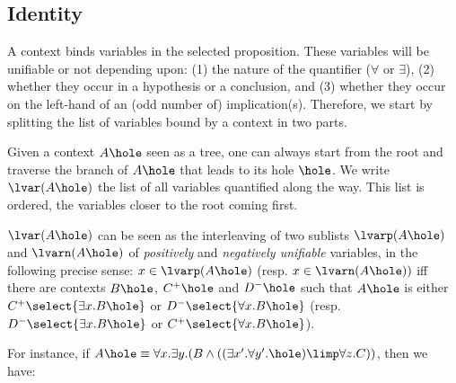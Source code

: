 \subsection{Identity}

A context binds variables in the selected proposition. These variables
will be unifiable or not depending upon: (1) the nature of the quantifier
($\forall$ or $\exists$), (2) whether they occur in a hypothesis or a
conclusion, and (3) whether they occur on the left-hand of an (odd number
of) implication(s). Therefore, we start by splitting the list of
variables bound by a context in two parts.


\begin{definition}
Given a context $A\hole$ seen as a tree, one can always start from
the root and traverse the branch of $A\hole$ that leads to its hole
$\hole$. We write $\lvar(A\hole)$ the list of all variables
quantified along the way. This list is ordered, the variables closer
to the root coming first.

$\lvar(A\hole)$ can be seen as the interleaving of two sublists
$\lvarp(A\hole)$ and $\lvarn(A\hole)$ of \emph{positively} and
\emph{negatively unifiable} variables, in the following precise sense:
$x \in \lvarp(A\hole)$ (resp. $x \in \lvarn(A\hole))$ iff there
are contexts $B\hole$, $C^+\hole$ and $D^-\hole$ such that
$A\hole$ is either $C^+\select{\exists x. B\hole}$ or
$D^-\select{\forall x. B\hole}$ (resp. $D^-\select{\exists x. B\hole}$
or $C^+\select{\forall x. B\hole}$).

For instance, if $A\hole \equiv \forall x. \exists y. (B \land ((\exists x'.
\forall y'. \hole) \limp \forall z. C))$, then we have:


  

\end{definition}
